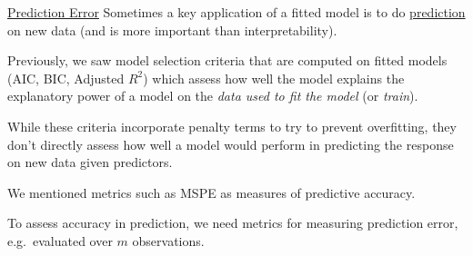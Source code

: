 \underline{Prediction Error}
Sometimes a key application of a fitted model
is to do \underline{prediction} on new data
(and is more important than interpretability).

Previously, we saw model selection criteria
that are computed on fitted models
(AIC, BIC, Adjusted $ R^2 $) which assess how
well the model explains the explanatory
power of a model on the \emph{data used to fit the model}
(or \emph{train}).

While these criteria incorporate penalty terms to try
to prevent overfitting, they don't directly assess
how well a model would perform in predicting the response
on new data given predictors.

We mentioned metrics such as MSPE as measures of predictive
accuracy.

To assess accuracy in prediction, we need metrics for
measuring prediction error, e.g.\ evaluated
over $ m $ observations.

